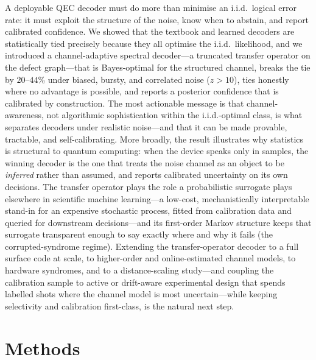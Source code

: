 \documentclass[reprint,aps,prxquantum,amsmath,amssymb,floatfix,nofootinbib,longbibliography]{revtex4-2}
\theoremstyle{definition}
\theoremstyle{remark}
\theoremstyle{plain}
\begin{document}
A deployable QEC decoder must do more than minimise an i.i.d.\ logical error rate: it must exploit the structure of the noise, know when to abstain, and report calibrated confidence. We showed that the textbook and learned decoders are statistically tied precisely because they all optimise the i.i.d.\ likelihood, and we introduced a channel-adaptive spectral decoder---a truncated transfer operator on the defect graph---that is Bayes-optimal for the structured channel, breaks the tie by $20$--$44\%$ under biased, bursty, and correlated noise ($z>10$), ties honestly where no advantage is possible, and reports a posterior confidence that is calibrated by construction. The most actionable message is that channel-awareness, not algorithmic sophistication within the i.i.d.-optimal class, is what separates decoders under realistic noise---and that it can be made provable, tractable, and self-calibrating. More broadly, the result illustrates why statistics is structural to quantum computing: when the device speaks only in samples, the winning decoder is the one that treats the noise channel as an object to be \emph{inferred} rather than assumed, and reports calibrated uncertainty on its own decisions. The transfer operator plays the role a probabilistic surrogate plays elsewhere in scientific machine learning---a low-cost, mechanistically interpretable stand-in for an expensive stochastic process, fitted from calibration data and queried for downstream decisions---and its first-order Markov structure keeps that surrogate transparent enough to say exactly where and why it fails (the corrupted-syndrome regime). Extending the transfer-operator decoder to a full surface code at scale, to higher-order and online-estimated channel models, to hardware syndromes, and to a distance-scaling study---and coupling the calibration sample to active or drift-aware experimental design that spends labelled shots where the channel model is most uncertain---while keeping selectivity and calibration first-class, is the natural next step.

\section{Methods}
\label{sec:methods}
\end{document}
